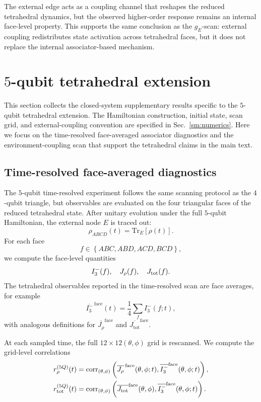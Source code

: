 \documentclass[aps,physrev,preprint,groupedaddress]{revtex4-2}
\begin{document}
The external edge acts as a coupling channel that reshapes the reduced tetrahedral dynamics, but the observed higher-order response remains an internal face-level property. This supports the same conclusion as the $g_E$-scan: external coupling redistributes state activation across tetrahedral faces, but it does not replace the internal associator-based mechanism.

\section{$5$-qubit tetrahedral extension}\label{sm:tetrahedron}
This section collects the closed-system supplementary results specific to the $5$-qubit tetrahedral extension. The Hamiltonian construction, initial state, scan grid, and external-coupling convention are specified in Sec.~\ref{sm:numerics}. Here we focus on the time-resolved
face-averaged associator diagnostics and the environment-coupling scan that support the tetrahedral claims in the main text.

\subsection{Time-resolved face-averaged diagnostics}\label{sm:tetrahedron-time-resolved}
The $5$-qubit time-resolved experiment follows the same scanning protocol as the $4$-qubit triangle, but observables are evaluated on the four triangular faces of the reduced tetrahedral state. After unitary evolution under the full $5$-qubit Hamiltonian, the external
node $E$ is traced out:
\begin{equation}
    \rho_{ABCD}(t)={\mathrm{Tr}}_{E}[\rho(t)] .
\end{equation}
For each face
\begin{equation}
    f\in\left\{ABC,ABD,ACD,BCD\right\},
\end{equation}
we compute the face-level quantities
\begin{equation}
    I_3^-(f),\quad J_\rho(f),\quad J_{\rm tot}(f).
\end{equation}
The tetrahedral observables reported in the time-resolved scan are face averages, for example
\begin{equation}
    \overline{I_3^-}^{\,{\mathrm{face}}}(t)=\frac{1}{4}\sum_f I_3^-(f;t),
\end{equation}
with analogous definitions for $\overline{J_\rho}^{\mathrm{face}}$ and $\overline{J_{\mathrm{tot}}}^{\mathrm{face}}$.

At each sampled time, the full $12\times12(\theta,\phi)$ grid is rescanned. We compute the grid-level correlations
\begin{align}
    r_\rho^{(5Q)}(t) &= {\mathrm{corr}}_{(\theta,\phi)}
    \left(\overline{J_\rho}^{\,{\mathrm{face}}}(\theta,\phi;t),\overline{I_3^-}^{\mathrm{face}}(\theta,\phi;t)\right),\\
    r_{\rm tot}^{(5Q)}(t) &= {\mathrm{corr}}_{(\theta,\phi)}
    \left(\overline{J_{\rm tot}}^{\mathrm{face}}(\theta,\phi),\overline{I_3^-}^\mathrm{face}(\theta,\phi;t)\right).
\end{align}
\end{document}
